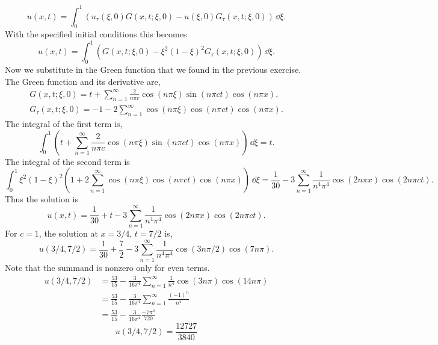 {\begin{Solution}
  \[
  \boxed{
    u(x, t) = \int_0^1 (u_\tau(\xi, 0) G(x, t; \xi, 0)
    - u(\xi, 0) G_{\tau}(x, t; \xi, 0) )\,\dd \xi.
    }
  \]
  With the specified initial conditions this becomes
  \[
  u(x, t) = \int_0^1 (G(x, t; \xi, 0)
  - \xi^2 (1-\xi)^2 G_\tau(x, t; \xi, 0) )\,\dd \xi.
  \]
  Now we substitute in the Green function that we found in the previous 
  exercise.  The Green function and its derivative are,
  \begin{gather*}
    G(x, t; \xi, 0) = t + \sum_{n = 1}^\infty \frac{2}{n \pi c} \cos(n \pi \xi)
    \sin(n \pi c t) \cos(n \pi x), \\
    G_\tau(x, t; \xi, 0) = -1 - 2 \sum_{n = 1}^\infty
    \cos(n \pi \xi) \cos(n \pi c t) \cos(n \pi x).
  \end{gather*}
  The integral of the first term is,
  \[
  \int_0^1 \left( t + \sum_{n = 1}^\infty \frac{2}{n \pi c} \cos(n \pi \xi)
    \sin(n \pi c t) \cos(n \pi x) \right) \,\dd \xi = t.
  \]
  The integral of the second term is
  \[
  \int_0^1 \xi^2 (1 - \xi)^2 \left( 1 + 2 \sum_{n = 1}^\infty \cos(n \pi \xi)
    \cos(n \pi c t) \cos(n \pi x) \right) \,\dd \xi
  = \frac{1}{30} - 3 \sum_{n = 1}^\infty \frac{1}{n^4 \pi^4} \cos(2 n \pi x)
  \cos(2 n \pi c t).
  \]
  Thus the solution is
  \[
  \boxed{
    u(x, t) = \frac{1}{30} + t - 3 \sum_{n = 1}^\infty \frac{1}{n^4 \pi^4} \cos(2 n \pi x)
    \cos(2 n \pi c t).
    }
  \]
  For $c = 1$, the solution at $x = 3/4$, $t = 7/2$ is,
  \[
  u(3/4, 7/2) = \frac{1}{30} + \frac{7}{2} - 3 \sum_{n = 1}^\infty \frac{1}{n^4 \pi^4} 
  \cos(3 n \pi / 2) \cos(7 n \pi).
  \]
  Note that the summand is nonzero only for even terms.
  \begin{align*}
    u(3/4, 7/2) &= \frac{53}{15} - \frac{3}{16 \pi^4} \sum_{n = 1}^\infty \frac{1}{n^4} 
    \cos(3 n \pi) \cos(14 n \pi) \\
    &= \frac{53}{15} - \frac{3}{16 \pi^4} \sum_{n = 1}^\infty \frac{(-1)^n}{n^4} \\
    &= \frac{53}{15} - \frac{3}{16 \pi^4} \frac{-7 \pi^4}{720}
  \end{align*}
  \[
  \boxed{
    u(3/4, 7/2) = \frac{12727}{3840}
    }
  \]
\end{Solution}






\raggedbottom
}
